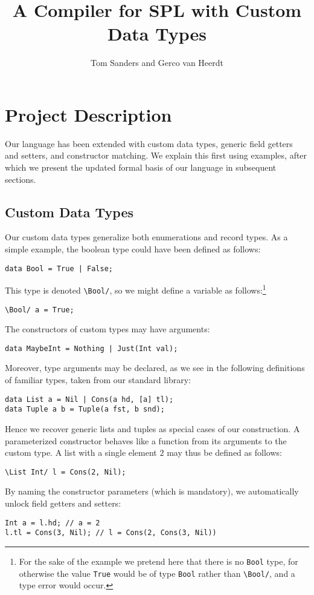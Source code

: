\documentclass[a4paper]{article}
\title{A Compiler for SPL with Custom Data Types}
\author{Tom Sanders and Gerco van Heerdt}
\begin{document}
\maketitle

\section{Project Description}

Our language has been extended with custom data types, generic field getters and setters, and constructor matching.
We explain this first using examples, after which we present the updated formal basis of our language in subsequent sections.

\subsection{Custom Data Types}

Our custom data types generalize both enumerations and record types.
As a simple example, the boolean type could have been defined as follows:
\begin{verbatim}
data Bool = True | False;\end{verbatim}
This type is denoted \verb+\Bool/+, so we might define a variable as follows:\footnote{%
    For the sake of the example we pretend here that there is no \verb+Bool+ type, for otherwise the value \verb+True+ would be of type \verb+Bool+ rather than \verb+\Bool/+, and a type error would occur.
}
\begin{verbatim}
\Bool/ a = True;\end{verbatim}
The constructors of custom types may have arguments:
\begin{verbatim}
data MaybeInt = Nothing | Just(Int val);\end{verbatim}
Moreover, type arguments may be declared, as we see in the following definitions of familiar types, taken from our standard library:
\begin{verbatim}
data List a = Nil | Cons(a hd, [a] tl);
data Tuple a b = Tuple(a fst, b snd);\end{verbatim}
Hence we recover generic lists and tuples as special cases of our construction.
A parameterized constructor behaves like a function from its arguments to the custom type.
A list with a single element $2$ may thus be defined as follows:
\begin{verbatim}
\List Int/ l = Cons(2, Nil);\end{verbatim}
By naming the constructor parameters (which is mandatory), we automatically unlock field getters and setters:
\begin{verbatim}
Int a = l.hd; // a = 2
l.tl = Cons(3, Nil); // l = Cons(2, Cons(3, Nil))\end{verbatim}
\end{document}
